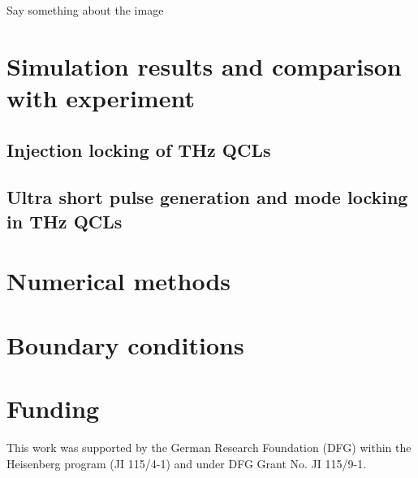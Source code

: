 \documentclass[journal]{IEEEtran}
\begin{document}
Say something about the image

\section{Simulation results and comparison with experiment}
\subsection{Injection locking of THz QCLs}
\subsection{Ultra short pulse generation and mode locking in THz QCLs}
\begin{appendices}
\section{Numerical methods}
\section{Boundary conditions}
\end{appendices}

\section*{Funding}
This work was supported by the German Research Foundation (DFG) within the Heisenberg program (JI 115/4-1) and under DFG Grant No. JI 115/9-1.



\end{document}
